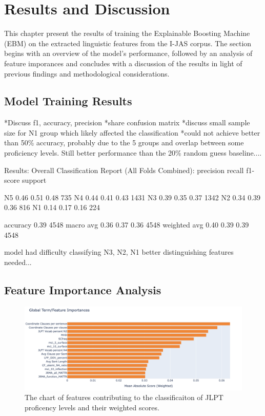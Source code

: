 \chapter{Results and Discussion}
This chapter present the results of training the Explainable Boosting Machine (EBM) on the extracted linguistic
features from the I-JAS corpus. The section begins with an overview of the model's performance, followed by an
analysis of feature imporances and concludes with a discussion of the results in light of previous findings and
methodological considerations.


\section{Model Training Results}
*Discuss f1, accuracy, precision
*share confusion matrix
*discuss small sample size for N1 group which likely affected the classification
*could not achieve better than 50\% accuracy, probably due to the 5 groups and overlap between some proficiency
levels. Still better performance than the 20\% random guess baseline....

Results:
 Overall Classification Report (All Folds Combined):
              precision    recall  f1-score   support

          N5       0.46      0.51      0.48       735
          N4       0.44      0.41      0.43      1431
          N3       0.39      0.35      0.37      1342
          N2       0.34      0.39      0.36       816
          N1       0.14      0.17      0.16       224

    accuracy                           0.39      4548
   macro avg       0.36      0.37      0.36      4548
weighted avg       0.40      0.39      0.39      4548

model had difficulty classifying N3, N2, N1 better distinguishing features needed...
\section{Feature Importance Analysis}
\begin{figure}[h!]
    \centering
    \includegraphics[scale=.4]{img/feature_importance}
    \caption{The chart of features contributing to the classificaiton of JLPT proficency levels and their weighted scores.}
    \label{fig:featureimportance}
\end{figure}


